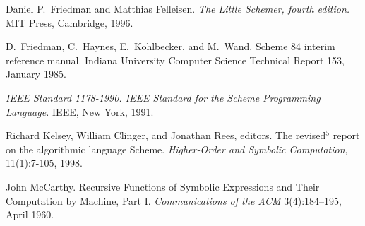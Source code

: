 \begin{thebibliography}{999}



Daniel P.~Friedman and Matthias Felleisen.
{\em The Little Schemer, fourth edition.}
MIT Press, Cambridge, 1996.

D.~Friedman, C.~Haynes, E.~Kohlbecker, and M.~Wand.
Scheme 84 interim reference manual.
Indiana University Computer Science Technical Report 153, January 1985.



{\em IEEE Standard 1178-1990.  IEEE Standard for the Scheme
  Programming Language.}  IEEE, New York, 1991.


Richard Kelsey, William Clinger, and Jonathan Rees, editors.
The revised$^5$ report on the algorithmic language Scheme.
{\em Higher-Order and Symbolic Computation}, 11(1):7-105, 1998.



John McCarthy.
Recursive Functions of Symbolic Expressions and Their Computation by Machine, Part I.
{\em Communications of the ACM} 3(4):184--195, April 1960.


\end{thebibliography}
